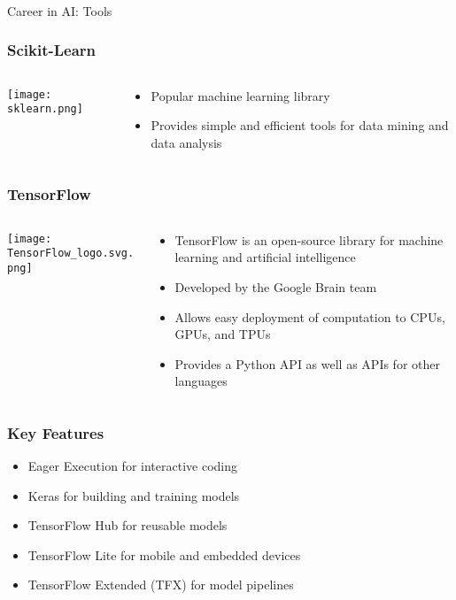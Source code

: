 \begin{frame}[fragile]\frametitle{}
\begin{center}
{\Large Career in AI: Tools}
\end{center}
\end{frame}


\begin{frame}[fragile]\frametitle{Scikit-Learn}
\begin{columns}[T]
\begin{column}{.48\textwidth}
\texttt{[image: sklearn.png]}
\end{column}
\begin{column}{.48\textwidth}
\begin{itemize}
\item Popular machine learning library
\item Provides simple and efficient tools for data mining and data analysis
\end{itemize}
\end{column}
\end{columns}
\end{frame}

\begin{frame}[fragile]\frametitle{TensorFlow}
\begin{columns}[T]
\begin{column}{.48\textwidth}
\texttt{[image: TensorFlow\_logo.svg.png]}
\end{column}
\begin{column}{.48\textwidth}
\begin{itemize}
\item TensorFlow is an open-source library for machine learning and artificial intelligence
\item Developed by the Google Brain team
\item Allows easy deployment of computation to CPUs, GPUs, and TPUs
\item Provides a Python API as well as APIs for other languages
\end{itemize}
\end{column}
\end{columns}
\end{frame}

\begin{frame}[fragile]\frametitle{Key Features}
\begin{itemize}
\item Eager Execution for interactive coding
\item Keras for building and training models
\item TensorFlow Hub for reusable models
\item TensorFlow Lite for mobile and embedded devices
\item TensorFlow Extended (TFX) for model pipelines
\end{itemize}
\end{frame}

